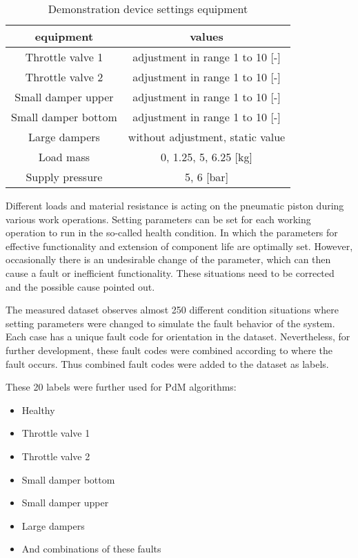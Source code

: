 \begin{table}[h]
    \centering
    \begin{tabular}{|c|c|}
        \hline
        \textbf{equipment}  & \textbf{values} \\  \hline
        Throttle valve 1    & adjustment in range 1 to 10 [-] \\
        Throttle valve 2    & adjustment in range 1 to 10 [-] \\
        Small damper upper  & adjustment in range 1 to 10 [-] \\
        Small damper bottom & adjustment in range 1 to 10 [-] \\
        Large dampers       & without adjustment, static value \\
        Load mass           & 0, 1.25, 5, 6.25 [kg] \\
        Supply pressure     & 5, 6 [bar]    \\
        \hline
    \end{tabular}
    \caption{Demonstration device settings equipment}
    \label{tab:setting}
\end{table}


Different loads and material resistance is acting on the pneumatic piston
during various work operations. Setting parameters can be set for each
working operation to run in the so-called health condition. In which the
parameters for effective functionality and extension of component life are
optimally set. However, occasionally there is an undesirable change of the
parameter, which can then cause a fault or inefficient functionality. These
situations need to be corrected and the possible cause pointed out.


The measured dataset observes almost 250 different condition situations
where setting parameters were changed to simulate the fault behavior of the
system. Each case has a unique fault code for orientation in the dataset.
Nevertheless, for further development, these fault codes were combined
according to where the fault occurs. Thus combined fault codes were added
to the dataset as labels.

These 20 labels were further used for PdM algorithms:

\begin{itemize}
    \item Healthy
    \item Throttle valve 1
    \item Throttle valve 2 
    \item Small damper bottom
    \item Small damper upper
    \item Large dampers 
    \item And combinations of these faults
\end{itemize}


